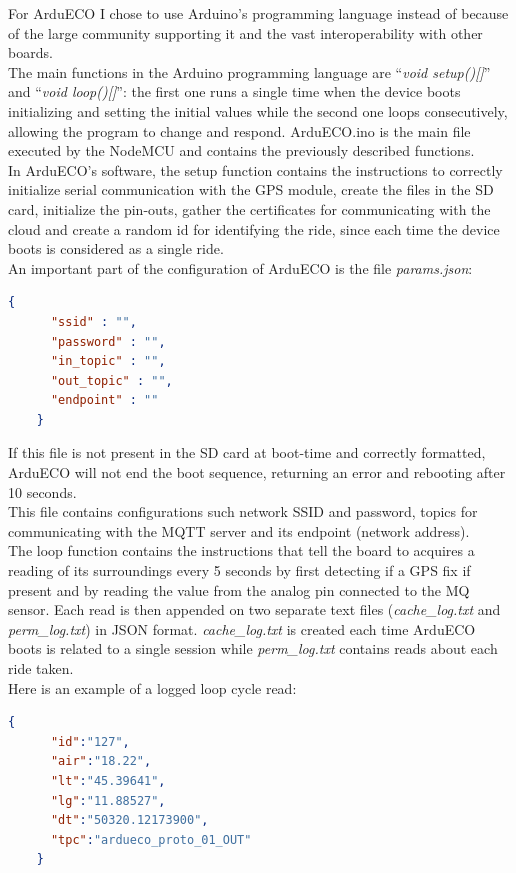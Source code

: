\documentclass[conference]{IEEEtran}
\begin{document}
		For ArduECO I chose to use Arduino's programming language instead of \cite{micropyhton} because of the large community supporting it and the vast interoperability with other boards.\\
		The main functions in the Arduino programming language are ``\textit{void setup()[]}'' and ``\textit{void loop()[]}'': the first one runs a single time when the device boots initializing and setting the initial values while the second one loops consecutively, allowing the program to change and respond.
		ArduECO.ino is the main file executed by the NodeMCU and contains the previously described functions.\\
		In ArduECO's software, the setup function contains the instructions to correctly initialize serial communication with the GPS module, create the files in the SD card, initialize the pin-outs, gather the certificates for communicating with the cloud and create a random id for identifying the ride, since each time the device boots is considered as a single ride.\\
		An important part of the configuration of ArduECO is the file \textit{params.json}:
		\begin{lstlisting}[language=json,firstnumber=1]
    {
	  "ssid" : "",
	  "password" : "",
	  "in_topic" : "",
	  "out_topic" : "",
	  "endpoint" : ""
    }
		\end{lstlisting}
		If this file is not present in the SD card at boot-time and correctly formatted, ArduECO will not end the boot sequence, returning an error and rebooting after 10 seconds.\\
		This file contains configurations such network SSID and password, topics for communicating with the MQTT server and its endpoint (network address).\\
		The loop function contains the instructions that tell the board to acquires a reading of its surroundings every 5 seconds by first detecting if a GPS fix if present and by reading the value from the analog pin connected to the MQ sensor.
		Each read is then appended on two separate text files (\textit{cache\_log.txt} and \textit{perm\_log.txt}) in JSON format. 
		\textit{cache\_log.txt} is created each time ArduECO boots is related to a single session while \textit{perm\_log.txt} contains reads about each ride taken.\\
		Here is an example of a logged loop cycle read:
		\begin{lstlisting}[language=json,firstnumber=1]		
    {
	  "id":"127",
	  "air":"18.22",
	  "lt":"45.39641",
	  "lg":"11.88527",
	  "dt":"50320.12173900",
	  "tpc":"ardueco_proto_01_OUT"
    }
		\end{lstlisting}	
\end{document}
